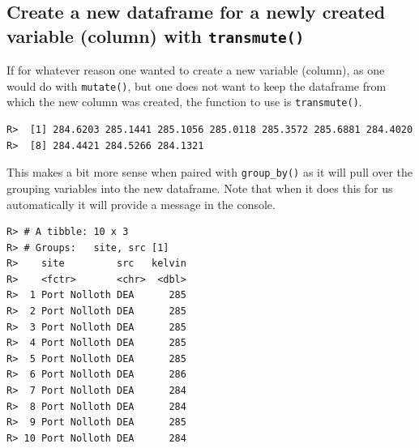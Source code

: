 \documentclass[]{book}
\newenvironment{Shaded}{\begin{snugshade}}{\end{snugshade}}
\newcommand{\KeywordTok}[1]{\textcolor[rgb]{0.13,0.29,0.53}{\textbf{#1}}}
\newcommand{\DataTypeTok}[1]{\textcolor[rgb]{0.13,0.29,0.53}{#1}}
\newcommand{\FloatTok}[1]{\textcolor[rgb]{0.00,0.00,0.81}{#1}}
\newcommand{\StringTok}[1]{\textcolor[rgb]{0.31,0.60,0.02}{#1}}
\newcommand{\OperatorTok}[1]{\textcolor[rgb]{0.81,0.36,0.00}{\textbf{#1}}}
\newcommand{\NormalTok}[1]{#1}
\theoremstyle{definition}
\theoremstyle{definition}
\theoremstyle{definition}
\theoremstyle{remark}
\begin{document}
\subsection{\texorpdfstring{Create a new dataframe for a newly created
variable (column) with
\texttt{transmute()}}{Create a new dataframe for a newly created variable (column) with transmute()}}\label{create-a-new-dataframe-for-a-newly-created-variable-column-with-transmute}

If for whatever reason one wanted to create a new variable (column), as
one would do with \texttt{mutate()}, but one does not want to keep the
dataframe from which the new column was created, the function to use is
\texttt{transmute()}.

\begin{Shaded}
\end{Shaded}

\begin{verbatim}
R>  [1] 284.6203 285.1441 285.1056 285.0118 285.3572 285.6881 284.4020
R>  [8] 284.4421 284.5266 284.1321
\end{verbatim}

This makes a bit more sense when paired with \texttt{group\_by()} as it
will pull over the grouping variables into the new dataframe. Note that
when it does this for us automatically it will provide a message in the
console.

\begin{Shaded}
\end{Shaded}

\begin{verbatim}
R> # A tibble: 10 x 3
R> # Groups:   site, src [1]
R>    site         src   kelvin
R>    <fctr>       <chr>  <dbl>
R>  1 Port Nolloth DEA      285
R>  2 Port Nolloth DEA      285
R>  3 Port Nolloth DEA      285
R>  4 Port Nolloth DEA      285
R>  5 Port Nolloth DEA      285
R>  6 Port Nolloth DEA      286
R>  7 Port Nolloth DEA      284
R>  8 Port Nolloth DEA      284
R>  9 Port Nolloth DEA      285
R> 10 Port Nolloth DEA      284
\end{verbatim}
\end{document}

